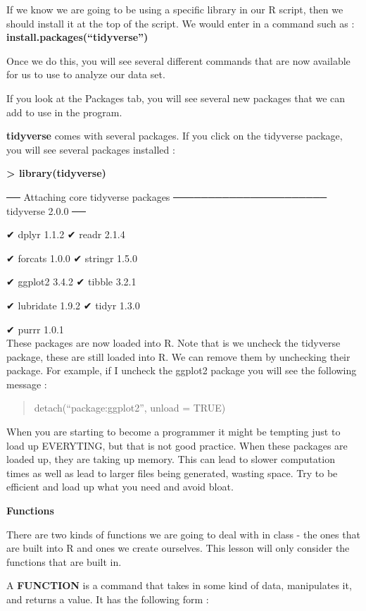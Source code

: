 \documentclass[
  letterpaper,
  DIV=11,
  numbers=noendperiod]{scrreprt}
\begin{document}
If we know we are going to be using a specific library in our R script,
then we should install it at the top of the script. We would enter in a
command such as : \textbf{install.packages(``tidyverse'')}

Once we do this, you will see several different commands that are now
available for us to use to analyze our data set.

If you look at the Packages tab, you will see several new packages that
we can add to use in the program.

\textbf{tidyverse} comes with several packages. If you click on the
tidyverse package, you will see several packages installed :

\textbf{\textgreater{} library(tidyverse)}

── Attaching core tidyverse packages ────────────────────── tidyverse
2.0.0 ──

✔ dplyr 1.1.2 ✔ readr 2.1.4

✔ forcats 1.0.0 ✔ stringr 1.5.0

✔ ggplot2 3.4.2 ✔ tibble 3.2.1

✔ lubridate 1.9.2 ✔ tidyr 1.3.0

✔ purrr 1.0.1\\

These packages are now loaded into R. Note that is we uncheck the
tidyverse package, these are still loaded into R. We can remove them by
unchecking their package. For example, if I uncheck the ggplot2 package
you will see the following message :

\begin{quote}
detach(``package:ggplot2'', unload = TRUE)
\end{quote}

When you are starting to become a programmer it might be tempting just
to load up EVERYTING, but that is not good practice. When these packages
are loaded up, they are taking up memory. This can lead to slower
computation times as well as lead to larger files being generated,
wasting space. Try to be efficient and load up what you need and avoid
bloat.

\textbf{Functions}

There are two kinds of functions we are going to deal with in class -
the ones that are built into R and ones we create ourselves. This lesson
will only consider the functions that are built in.

A \textbf{FUNCTION} is a command that takes in some kind of data,
manipulates it, and returns a value. It has the following form :
\end{document}
